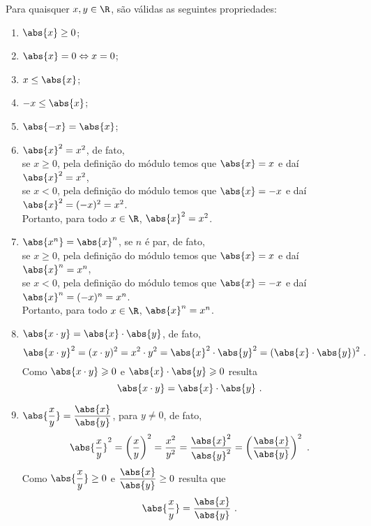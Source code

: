 \begin{prop}
 Para quaisquer $x, y \in \R$, são válidas as seguintes propriedades: \label{prop.modulo}
\begin{enumerate}
 \item $\abs{x} \geq 0$;
 \item $\abs{x}= 0 \Leftrightarrow x= 0$;
 \item $x \leq \abs{x}$;
 \item $-x \leq \abs{x}$;
 \item $\abs{-x}= \abs{x}$;
 \item $\abs{x}^2= x^2$, de fato,\\
 se $x \geq 0$, pela definição do módulo temos que $\abs{x}= x$ e daí $\abs{x}^2= x^2$, \\
 se $x < 0$, pela definição do módulo temos que $\abs{x}= -x$ e daí $\abs{x}^2=(-x)^2= x^2$.\\
 Portanto, para todo $x \in \R$, $\abs{x}^2= x^2$.

 \item $\abs{x^n}= \abs{x}^n$, se $n$ é par, de fato, \\
 se $x \geq 0$, pela definição do módulo temos que $\abs{x}= x$ e daí $\abs{x}^n= x^n$, \\
 se $x < 0$, pela definição do módulo temos que $\abs{x}= -x$ e daí $\abs{x}^n= (-x)^n= x^n$.\\
 Portanto, para todo $x \in \R$, $\abs{x}^n= x^n$.

 \item $\abs{x \cdot y}= \abs{x} \cdot \abs{y}$, de fato,
\begin{equation}
\abs{x \cdot y}^2= (x \cdot y)^2= x^2 \cdot y^2= \abs{x}^2 \cdot \abs{y}^2= (\abs{x} \cdot \abs{y})^2 \ .
\end{equation}
 Como $\abs{x \cdot y} \geqslant 0$ e $\abs{x} \cdot \abs{y} \geqslant 0$ resulta
\begin{equation}
\abs{x \cdot y}= \abs{x} \cdot \abs{y} \ . 
\end{equation}

 \item $\abs{\dfrac{x}{y}}= \dfrac{\abs{x}}{\abs{y}}$, para $y \neq 0$, de fato,
\begin{equation}
\abs{\dfrac{x}{y}}^2= \left(\dfrac{x}{y} \right)^2= \dfrac{x^2}{y^2}= \dfrac{\abs{x}^2}{\abs{y}^2}= \left( \dfrac{\abs{x}}{\abs{y}} \right)^2 \ . 
\end{equation}
 Como $\abs{\dfrac{x}{y}} \geq 0$ e $\dfrac{\abs{x}}{\abs{y}} \geq 0$ resulta que
\begin{equation}
\abs{\dfrac{x}{y}}= \dfrac{\abs{x}}{\abs{y}} \ .
\end{equation}


\end{enumerate}
\end{prop}
